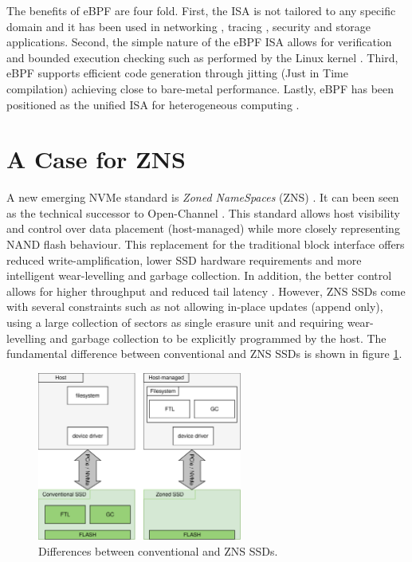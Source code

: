 The benefits of eBPF are four fold. First, the ISA is not tailored to any
specific domain and it has been used in networking \cite{xdp},
tracing \cite{enhanced-ebpf}, security \cite{seccomp} and storage \cite{280870}
applications. Second, the simple nature of the eBPF ISA allows for verification
and bounded execution checking such as performed by the Linux kernel
\cite{kern-analysis}. Third, eBPF supports efficient code generation through
jitting (Just in Time compilation) achieving close to bare-metal performance.
Lastly, eBPF has been positioned as the unified ISA for heterogeneous computing
\cite{Brunella2020hXDPES, bpf-uapi}.

\section{A Case for ZNS}

\label{znscase}

A new emerging NVMe standard is \textit{Zoned NameSpaces} (ZNS) \cite{zns}. It
can been seen as the technical successor to Open-Channel
\cite{Bjrling2017LightNVMTL}. This standard allows host visibility and control
over data placement (host-managed) while more closely representing NAND flash
behaviour. This replacement for the traditional block interface offers reduced
write-amplification, lower SSD hardware requirements and more intelligent
wear-levelling and garbage collection. In addition, the better control
allows for higher throughput and reduced tail latency \cite{273945}. However,
ZNS SSDs come with several constraints such as not allowing in-place updates
(append only), using a large collection of sectors as single erasure unit and
requiring wear-levelling and garbage collection to be explicitly programmed by
the host. The fundamental difference between conventional and ZNS SSDs is shown
in figure \ref{figure:znsvsconventional}.

\begin{figure}
    \centering
	\includegraphics[width=0.6\textwidth]{resources/images/zns-vs-conventional.pdf}
	\caption{Differences between conventional and ZNS SSDs.}
    \label{figure:znsvsconventional}
\end{figure}

